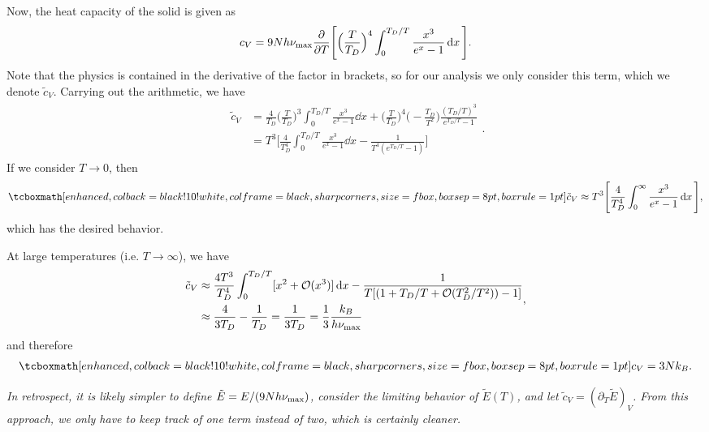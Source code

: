 {Now, the heat capacity of the solid is given as
\begin{eqnarray}
    c_{V} = 9 N h \nu_{\rm max} \pdv{T} \Bigg[ \Big( \frac{T}{T_{D}} \Big)^{4} \int_{0}^{T_{D}/T}\frac{x^3}{e^{x} - 1} \dd{x} \Bigg]
.\end{eqnarray}
Note that the physics is contained in the derivative of the factor in brackets, so for our analysis we only consider this term, which we denote $\tilde{c}_{V}$.
Carrying out the arithmetic, we have 
\begin{eqnarray}
   \begin{aligned}
       \tilde{c}_{V} &= \frac{4}{T_{D}} \Big( \frac{T}{T_{D}} \Big)^{3} \int_{0}^{T_{D}/T} \frac{x^3}{e^{x} - 1} \dd{x} + \Big( \frac{T}{T_{D}} \Big)^{4} \Big( -\frac{T_{D}}{T^2} \Big) \frac{(T_{D}/T)^3}{e^{T_{D}/T} - 1} \\
                     &= T^3 \Bigg[ \frac{4}{T_{D}^{4}} \int_{0}^{T_{D}/T} \frac{x^{3}}{e^{x} - 1} \dd{x} - \frac{1}{T^{4}(e^{T_{D}/T} - 1)} \Bigg]
   \end{aligned} 
.\end{eqnarray}
If we consider $T \rightarrow 0$, then
\begin{eqnarray}
    \eqbox{ \tilde{c}_{V} \approx T^3 \Bigg[ \frac{4}{T_{D}^{4}} \int_{0}^{\infty} \frac{x^3}{e^{x} - 1} \dd{x} \Bigg] }
,\end{eqnarray}
which has the desired behavior.

At large temperatures (i.e. $T \rightarrow \infty$), we have
\begin{eqnarray}
    \begin{aligned}
        \tilde{c}_{V} &\approx \frac{4T^3}{T_{D}^{4}} \int_{0}^{T_{D}/T} [x^2 + {\cal O}(x^3)] \dd{x} - \frac{1}{T[ (1 + T_{D}/T + {\cal O}(T_{D}^2/T^2)) - 1 ]} \\
                      &\approx \frac{4}{3 T_{D}} - \frac{1}{T_{D}} = \frac{1}{3 T_{D}} = \frac{1}{3} \frac{k_{B}}{h \nu_{\rm max}}
    \end{aligned}
,\end{eqnarray}
and therefore
\begin{eqnarray}
    \eqbox{ c_{V} = 3 N k_{B} }
.\end{eqnarray}

\textit{ In retrospect, it is likely simpler to define $\tilde{E} = E/(9 N h \nu_{\rm max})$, consider the limiting behavior of $\tilde{E}(T)$, and let $\tilde{c}_{V} = (\partial_{T} \tilde{E})_{V}$.
From this approach, we only have to keep track of one term instead of two, which is certainly cleaner. }


}


